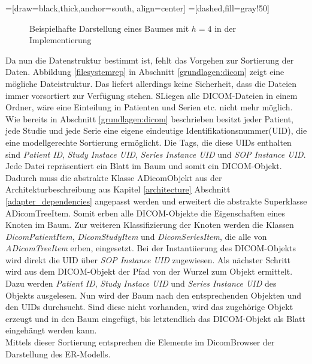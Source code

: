 =[draw=black,thick,anchor=south, align=center]
=[dashed,fill=gray!50]
\begin{figure}[htbp]
\centering
\caption{Beispielhafte Darstellung eines Baumes mit $h = 4$ in der Implementierung}
\label{treeexample}
\end{figure}

Da nun die Datenstruktur bestimmt ist, fehlt das Vorgehen zur Sortierung der Daten. Abbildung \ref{filesystemrep} in Abschnitt \ref{grundlagen:dicom} zeigt eine mögliche Dateistruktur. Das liefert allerdings keine Sicherheit, dass die Dateien immer vorsortiert zur Verfügung stehen. SLiegen alle DICOM-Dateien in einem Ordner, wäre eine Einteilung in Patienten und Serien etc. nicht mehr möglich.\\
Wie bereits in Abschnitt \ref{grundlagen:dicom} beschrieben besitzt jeder Patient, jede Studie und jede Serie eine eigene eindeutige Identifikationsnummer(UID), die eine modellgerechte Sortierung ermöglicht. Die Tags, die diese UIDs enthalten sind \textit{Patient ID}, \textit{Study Instace UID}, \textit{Series Instance UID} und \textit{SOP Instance UID}.\\
Jede Datei repräsentiert ein Blatt im Baum und somit ein DICOM-Objekt. Dadurch muss die abstrakte Klasse ADicomObjekt aus der Architekturbeschreibung aus Kapitel \ref{architecture} Abschnitt \ref{adapter_dependencies} angepasst werden und erweitert die abstrakte Superklasse ADicomTreeItem. Somit erben alle DICOM-Objekte die Eigenschaften eines Knoten im Baum. Zur weiteren Klassifizierung der Knoten werden die Klassen \textit{DicomPatientItem}, \textit{DicomStudyItem} und \textit{DicomSeriesItem}, die alle von \textit{ADicomTreeItem} erben, eingesetzt.
Bei der Instantiierung des DICOM-Objekts wird direkt die UID über \textit{SOP Instance UID} zugewiesen. Als nächster Schritt wird aus dem DICOM-Objekt der Pfad von der Wurzel zum Objekt ermittelt. Dazu werden \textit{Patient ID}, \textit{Study Instace UID} und \textit{Series Instance UID} des Objekts ausgelesen. Nun wird der Baum nach den entsprechenden Objekten und den UIDs durchsucht. Sind diese nicht vorhanden, wird das zugehörige Objekt erzeugt und in den Baum eingefügt, bis letztendlich das DICOM-Objekt als Blatt eingehängt werden kann.\\
Mittels dieser Sortierung entsprechen die Elemente im DicomBrowser der Darstellung des ER-Modells.


